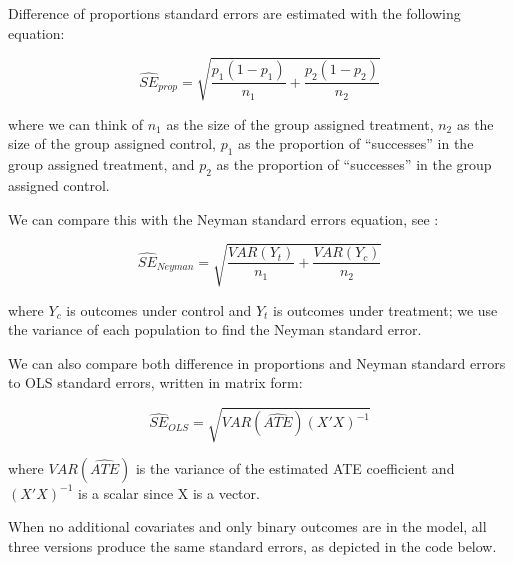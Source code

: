 \documentclass[
  12pt,
]{book}
\theoremstyle{definition}
\theoremstyle{definition}
\theoremstyle{definition}
\theoremstyle{remark}
\begin{document}
Difference of proportions standard errors are estimated with the
following equation:

\begin{equation}
\widehat{SE}_{prop} = \sqrt{\frac{p_{1}(1-p_{1})}{n_{1}}+\frac{p_{2}(1-p_{2})}{n_{2}}}
\end{equation}

where we can think of \(n_1\) as the size of the group assigned
treatment, \(n_2\) as the size of the group assigned control, \(p_1\) as
the proportion of ``successes'' in the group assigned treatment, and
\(p_2\) as the proportion of ``successes'' in the group assigned
control.

We can compare this with the Neyman standard errors equation, see
\citet{lin_agnostic_2013}:

\begin{equation}
\widehat{SE}_{Neyman} = \sqrt{\frac{VAR(Y_{t})}{n_1}+\frac{VAR(Y_{c})}{n_2}}
\end{equation}

where \(Y_c\) is outcomes under control and \(Y_t\) is outcomes under
treatment; we use the variance of each population to find the Neyman
standard error.

We can also compare both difference in proportions and Neyman standard
errors to OLS standard errors, written in matrix form:

\[ \widehat{SE}_{OLS} = \sqrt{VAR(\widehat{ATE})(X'X)^{-1}} \]

where \(VAR(\widehat{ATE})\) is the variance of the estimated ATE
coefficient and \((X'X)^{-1}\) is a scalar since X is a vector.

When no additional covariates and only binary outcomes are in the model,
all three versions produce the same standard errors, as depicted in the
code below.
\end{document}
